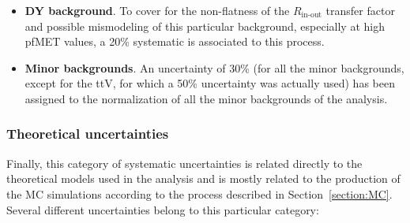 \documentclass[a4paper, 10pt, openright]{report}
\begin{document}
\begin{itemize}
\item \textbf{\acf{DY} background}. To cover for the non-flatness of the $R_{\text{in-out}}$ transfer factor and possible mismodeling of this particular background, especially at high pf\ac{MET} values, a 20\% systematic is associated to this process.
\item \textbf{Minor backgrounds}. An uncertainty of 30\% (for all the minor backgrounds, except for the ttV, for which a 50\% uncertainty was actually used) has been assigned to the normalization of all the minor backgrounds of the analysis.
\end{itemize}

\subsubsection{Theoretical uncertainties}

Finally, this category of systematic uncertainties is related directly to the theoretical models used in the analysis and is mostly related to the production of the \ac{MC} simulations according to the process described in Section~\ref{section:MC}. Several different uncertainties belong to this particular category:
\end{document}

